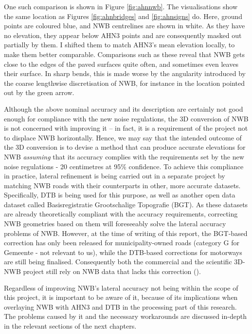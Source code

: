 One such comparison is shown in Figure \ref{fig:ahnnwb}. The visualisations show the same location as Figures \ref{fig:ahnbridges} and \ref{fig:ahnsigns} do. Here, ground points are coloured blue, and NWB centrelines are shown in white. As they have no elevation, they appear below AHN3 points and are consequently masked out partially by them. I shifted them to match AHN3's mean elevation locally, to make them better comparable. Comparisons such as these reveal that NWB gets close to the edges of the paved surfaces quite often, and sometimes even leaves their surface. In sharp bends, this is made worse by the angularity introduced by the coarse lengthwise discretisation of NWB, for instance in the location pointed out by the green arrow.

Although the above nominal accuracy and its description are certainly not good enough for compliance with the new noise regulations, the 3D conversion of NWB is not concerned with improving it – in fact, it is a requirement of the project not to displace NWB horizontally. Hence, we may say that the intended outcome of the 3D conversion is to devise a method that can produce accurate elevations for NWB \textit{assuming} that its accuracy complies with the requirements set by the new noise regulations - 20 centimetres at 95\% confidence. To achieve this compliance in practice, lateral refinement is being carried out in a separate project by matching NWB roads with their counterparts in other, more accurate datasets. Specifically, DTB is being used for this purpose, as well as another open data dataset called Basisregistratie Grootschalige Topografie (BGT). As these datasets are already theoretically compliant with the accuracy requirements, correcting NWB geometries based on them will foreseeably solve the lateral accuracy problems of NWB. However, at the time of writing of this report, the BGT-based correction has only been released for municipality-owned roads (category G for Gemeente - not relevant to us), while the DTB-based corrections for motorways are still being finalised. Consequently both the commercial and the scientific 3D-NWB project still rely on NWB data that lacks this correction (\cite{nwb_gecorrigeerd}).

Regardless of improving NWB’s lateral accuracy not being within the scope of this project, it is important to be aware of it, because of its implications when overlaying NWB with AHN3 and DTB in the processing part of this research. The problems caused by it and the necessary workarounds are discussed in-depth in the relevant sections of the next chapters.

